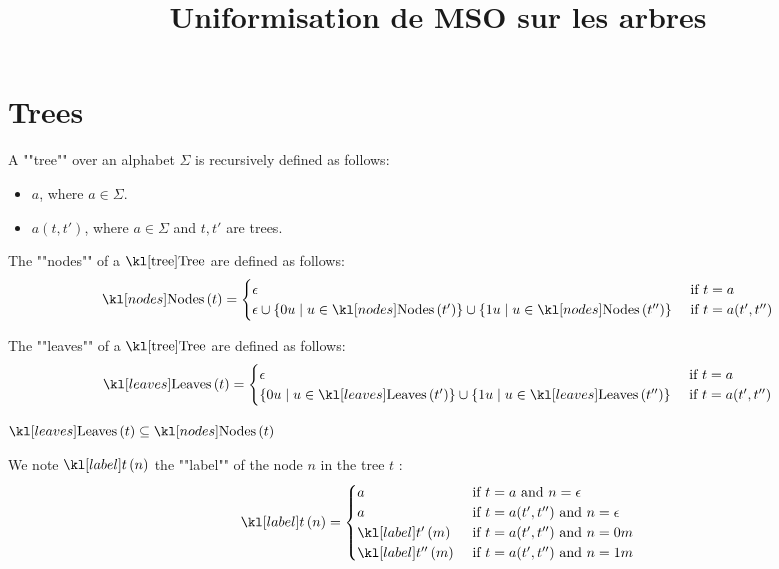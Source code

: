 \documentclass{article}
\begin{document}
\title{Uniformisation de MSO sur les arbres}

\maketitle

\section{Trees}


\begin{definition}[Tree]
	A ""tree"" over an alphabet $\Sigma$ is recursively defined as follows:
	\begin{itemize}
		\item $a$, where $a \in \Sigma$.
		\item $a(t,t')$, where $a \in \Sigma$ and $t, t'$ are trees.
	\end{itemize}
\end{definition}

\begin{definition}[Nodes]
	The ""nodes"" of a $\tree$ are defined as follows:
	\[
		\nodes t = \begin{cases}
			\epsilon                                & \text{ if } t = a         \\
			\epsilon \cup \setdef {0u} {u \in \nodes {t'}}
			\cup \setdef {1u} {u \in \nodes {t''} } & \text{ if } t = a(t',t'')
		\end{cases}
	\]
\end{definition}


\begin{definition}[Leaves]
	The ""leaves"" of a $\tree$ are defined as follows:
	\[
		\leaves t = \begin{cases}
			\epsilon                                 & \text{ if } t = a         \\
			\setdef {0u} {u \in \leaves {t'}}
			\cup \setdef {1u} {u \in \leaves {t''} } & \text{ if } t = a(t',t'')
		\end{cases}
	\]
\end{definition}

\begin{remark}
	$\leaves t \subseteq \nodes t$
\end{remark}

\begin{definition}
	We note $\tlabel t n$ the ""label"" of the node $n$ in the tree $t$ :
	\[
		\tlabel t n =   \begin{cases}
			a               & \text{ if } t = a \text{ and } n = \epsilon         \\
			a               & \text{ if } t = a(t',t'') \text{ and } n = \epsilon \\
			\tlabel {t'} m  & \text{ if } t = a(t',t'') \text{ and } n = 0m       \\
			\tlabel {t''} m & \text{ if } t = a(t',t'') \text{ and } n = 1m
		\end{cases}
	\]
\end{definition}
\end{document}

